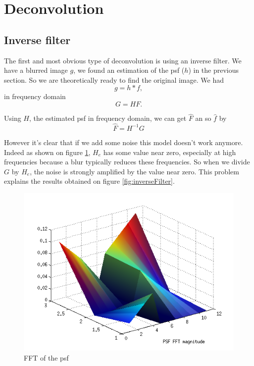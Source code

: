 \section{Deconvolution}
\subsection{Inverse filter}
The first and most obvious type of deconvolution is using an inverse filter. We have a blurred image $g$, we found an estimation of the psf ($h$) in the previous section. So we are theoretically ready to find the original image. We had
\begin{equation}
 g =  h*f,
\end{equation}
in frequency domain
\begin{equation}
G = HF. 
\end{equation}

Using $H$, the estimated psf in frequency domain, we can get $\hat{F}$ an so $\hat{f}$ by 
\begin{equation}
\hat{F} = H^{-1} G
\end{equation} 

However it's clear that if we add some noise this model doesn't work anymore. Indeed as shown on figure \ref{fig:psfFFT}, $H_e$ has some value near zero, especially at high frequencies because a blur typically reduces these frequencies. So when we divide $G$ by $H_e$, the noise is strongly amplified by the value near zero. This problem explains the results obtained on figure \ref{fig:inverseFilter}.   

\begin{figure}
\centering
\includegraphics[scale=0.5]{../Images/psfFFT.png}
\caption{FFT of the psf}
\label{fig:psfFFT}
\end{figure}

